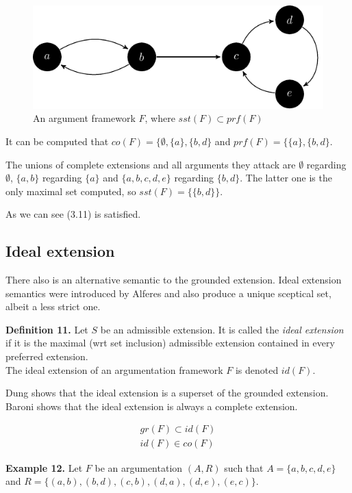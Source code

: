 \documentclass[draft,final]{vutinfth} %
\newcommand{\hl}{\par\vspace{6pt}} %
\newcommand{\cl}{\par\vspace{12pt}} %
\begin{document}
\FloatBarrier
	\begin{figure}[!h]
		\centering
		\includegraphics[width=\linewidth]{graphs/ex5.pdf}
		\caption{An argument framework $F$, where $sst(F)\subset prf(F)$}
	\end{figure}
\FloatBarrier

It can be computed that $co(F)=\{\emptyset,\{a\},\{b,d\}$ and $prf(F)=\{\{a\},\{b,d\}$.\hl
The unions of complete extensions and all arguments they attack are $\emptyset$ regarding $\emptyset$, $\{a,b\}$ regarding $\{a\}$ and $\{a,b,c,d,e\}$ regarding $\{b,d\}$. The latter one is the only maximal set computed, so $sst(F)=\{\{b,d\}\}$.\hl
As we can see (3.11) is satisfied.\cl

\subsection{Ideal extension}
There also is an alternative semantic to the grounded extension. Ideal extension semantics were introduced by Alferes \cite{Alferes} and also produce a unique sceptical set, albeit a less strict one.\hl

\textbf{Definition 11.} Let $S$ be an admissible extension. It is called the \emph{ideal extension} if it is the maximal (wrt set inclusion) admissible extension contained in every preferred extension.\\
The ideal extension of an argumentation framework $F$ is denoted $id(F)$.\hl

Dung \cite{Dung2} shows that the ideal extension is a superset of the grounded extension. Baroni \cite{Baroni} shows that the ideal extension is always a complete extension. %

\begin{align}
	gr(F)\subset id(F)\\
	id(F)\in co(F)
\end{align}\hl

\textbf{Example 12.} Let $F$ be an argumentation $(A,R)$ such that $A=\{a,b,c,d,e\}$ and $R=\{(a,b),(b,d),(c,b),(d,a),(d,e),(e,c)\}$.\hl
\end{document}
